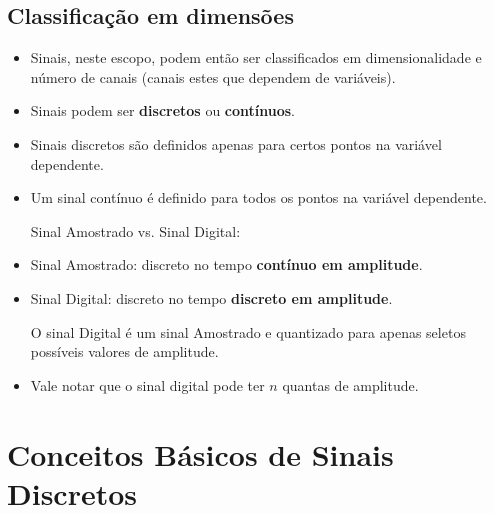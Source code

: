 \subsection{Classificação em dimensões}
\begin{itemize}
    \item Sinais, neste escopo, podem então ser classificados em dimensionalidade e número de canais (canais estes que dependem de variáveis).
    \item Sinais podem ser \textbf{discretos} ou \textbf{contínuos}.
    \item Sinais discretos são definidos apenas para certos pontos na variável dependente.
    \item Um sinal contínuo é definido para todos os pontos na variável dependente.
    
    Sinal Amostrado vs. Sinal Digital:

    \item Sinal Amostrado: discreto no tempo \textbf{contínuo em amplitude}.
    \item Sinal Digital: discreto no tempo \textbf{discreto em amplitude}.
    
    O sinal Digital é um sinal Amostrado e quantizado para apenas seletos possíveis valores de amplitude.

    \item Vale notar que o sinal digital pode ter $n$ quantas de amplitude.
\end{itemize}

\section{Conceitos Básicos de Sinais Discretos}
